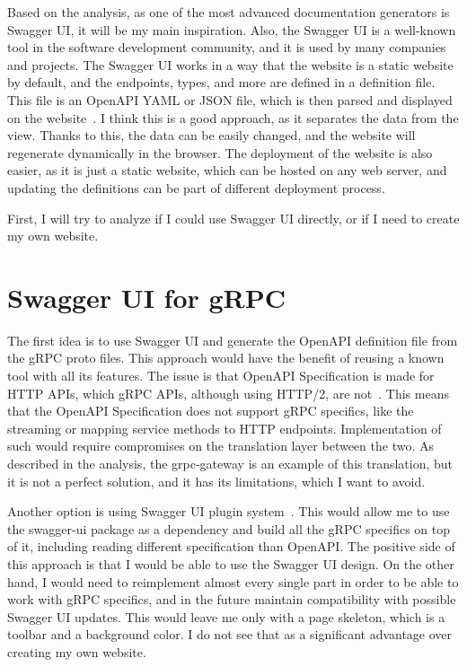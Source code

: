 Based on the analysis, as one of the most advanced documentation generators is Swagger UI, it will be my main inspiration.
Also, the Swagger UI is a well-known tool in the software development community, and it is used by many companies and projects.
The Swagger UI works in a way that the website is a static website by default, and the endpoints, types, and more are defined in a definition file.
This file is an OpenAPI YAML or JSON file, which is then parsed and displayed on the website~\cite{swagger-ui-definition-file}.
I think this is a good approach, as it separates the data from the view.
Thanks to this, the data can be easily changed, and the website will regenerate dynamically in the browser.
The deployment of the website is also easier, as it is just a static website, which can be hosted on any web server, and updating the definitions can be part of different deployment process.

First, I will try to analyze if I could use Swagger UI directly, or if I need to create my own website.


\section{Swagger UI for gRPC}
The first idea is to use Swagger UI and generate the OpenAPI definition file from the gRPC proto files.
This approach would have the benefit of reusing a known tool with all its features.
The issue is that OpenAPI Specification is made for HTTP APIs, which gRPC APIs, although using HTTP/2, are not~\cite{openapi-specification}.
This means that the OpenAPI Specification does not support gRPC specifics, like the streaming or mapping service methods to HTTP endpoints.
Implementation of such would require compromises on the translation layer between the two.
As described in the analysis, the grpc-gateway is an example of this translation, but it is not a perfect solution, and it has its limitations, which I want to avoid.

Another option is using Swagger UI plugin system~\cite{swagger-ui-plugins}.
This would allow me to use the swagger-ui package as a dependency and build all the gRPC specifics on top of it, including reading different specification than OpenAPI\@.
The positive side of this approach is that I would be able to use the Swagger UI design.
On the other hand, I would need to reimplement almost every single part in order to be able to work with gRPC specifics, and in the future maintain compatibility with possible Swagger UI updates.
This would leave me only with a page skeleton, which is a toolbar and a background color.
I do not see that as a significant advantage over creating my own website.

